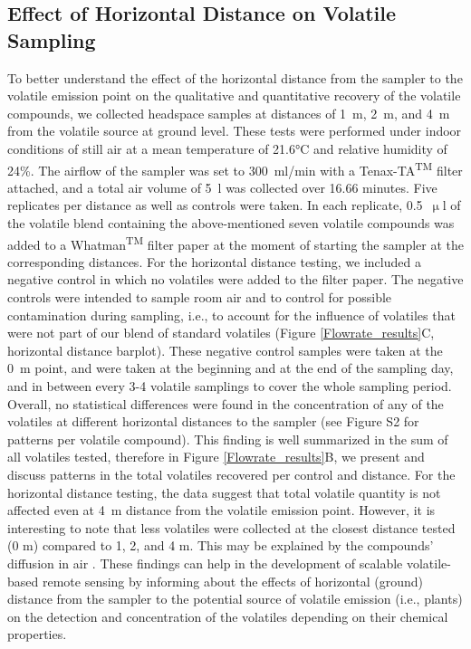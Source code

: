 \subsection{Effect of Horizontal Distance on Volatile Sampling}

To better understand the effect of the horizontal distance from the sampler to the volatile emission point on the qualitative and quantitative recovery of the volatile compounds, we collected headspace samples at distances of 1~m, 2~m, and 4~m from the volatile source at ground level. These tests were performed under indoor conditions of still air at a mean temperature of 21.6°C and relative humidity of 24\%. The airflow of the sampler was set to 300~ml/min with a Tenax-TA\textsuperscript{TM} filter attached, and a total air volume of 5~l was collected over 16.66 minutes. Five replicates per distance as well as controls were taken. In each replicate, 0.5~$\upmu$l of the volatile blend containing the above-mentioned seven volatile compounds was added to a Whatman\textsuperscript{TM} filter paper at the moment of starting the sampler at the corresponding distances. For the horizontal distance testing, we included a negative control in which no volatiles were added to the filter paper. The negative controls were intended to sample room air and to control for possible contamination during sampling, i.e., to account for the influence of volatiles that were not part of our blend of standard volatiles (Figure \ref{Flowrate_results}C, horizontal distance barplot). These negative control samples were taken at the 0~m point, and were taken at the beginning and at the end of the sampling day, and in between every 3-4 volatile samplings to cover the whole sampling period.
Overall, no statistical differences were found in the concentration of any of the volatiles at different horizontal  distances to the sampler (see Figure S2 for patterns per volatile compound). This finding is well summarized in the sum of all volatiles tested, therefore in Figure \ref{Flowrate_results}B, we present and discuss patterns in the total volatiles recovered per control and distance. For the horizontal distance testing, the data suggest that total volatile quantity is not affected even at 4~m distance from the volatile emission point. However, it is interesting to note that less volatiles were collected at the closest distance tested (0 m) compared to 1, 2, and 4 m. This may be explained by the compounds' diffusion in air \cite{Schuman2023}. These findings can help in the development of scalable volatile-based remote sensing by informing about the effects of horizontal (ground) distance from the sampler to the potential source of volatile emission (i.e., plants) on the detection and concentration of the volatiles depending on their chemical properties.



